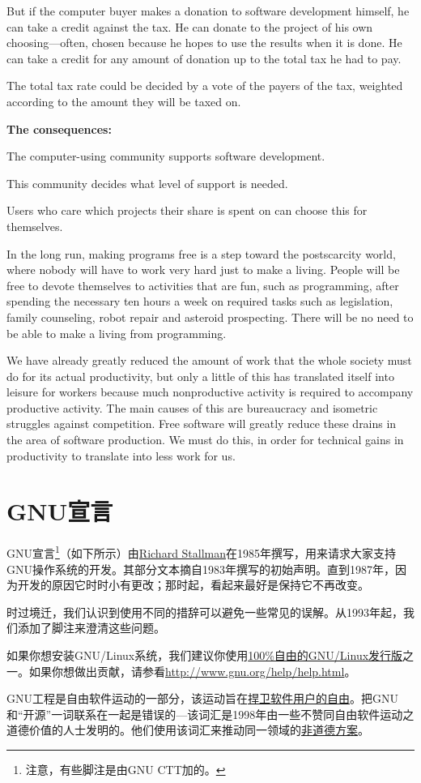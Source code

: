 But if the computer buyer makes a donation to software development himself, he can take a credit against the tax. He can donate to the project of his own choosing—often, chosen because he hopes to use the results when it is done. He can take a credit for any amount of donation up to the total tax he had to pay.\par
The total tax rate could be decided by a vote of the payers of the tax, weighted according to the amount they will be taxed on.\par
\textbf{The consequences:}\par
The computer-using community supports software development.\par
This community decides what level of support is needed.\par
Users who care which projects their share is spent on can choose this for themselves.\par
In the long run, making programs free is a step toward the postscarcity world, where nobody will have to work very hard just to make a living. People will be free to devote themselves to activities that are fun, such as programming, after spending the necessary ten hours a week on required tasks such as legislation, family counseling, robot repair and asteroid prospecting. There will be no need to be able to make a living from programming.\par
We have already greatly reduced the amount of work that the whole society must do for its actual productivity, but only a little of this has translated itself into leisure for workers because much nonproductive activity is required to accompany productive activity. The main causes of this are bureaucracy and isometric struggles against competition. Free software will greatly reduce these drains in the area of software production. We must do this, in order for technical gains in productivity to translate into less work for us.
\chapter{GNU宣言}
GNU宣言\footnote{注意，有些脚注是由GNU CTT加的。}（如下所示）由\href{http://www.stallman.org/}{Richard Stallman}在1985年撰写，用来请求大家支持GNU操作系统的开发。其部分文本摘自1983年撰写的初始声明。直到1987年，因为开发的原因它时时小有更改；那时起，看起来最好是保持它不再改变。\par
时过境迁，我们认识到使用不同的措辞可以避免一些常见的误解。从1993年起，我们添加了脚注来澄清这些问题。\par
如果你想安装GNU/Linux系统，我们建议你使用\href{http://www.gnu.org/distros}{100\%自由的GNU/Linux发行版}之一。如果你想做出贡献，请参看\url{http://www.gnu.org/help/help.html}。\par
GNU工程是自由软件运动的一部分，该运动旨在\href{http://www.gnu.org/philosophy/free-sw.html}{捍卫软件用户的自由}。把GNU和“开源”一词联系在一起是错误的—该词汇是1998年由一些不赞同自由软件运动之道德价值的人士发明的。他们使用该词汇来推动同一领域的\href{http://www.gnu.org/philosophy/open-source-misses-the-point.html}{非道德方案}。\par
